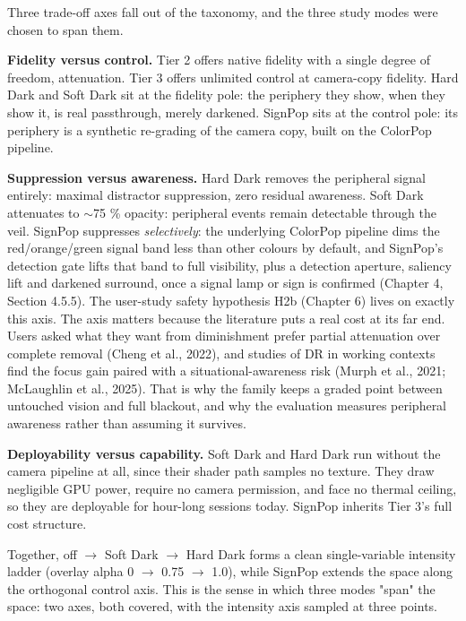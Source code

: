 Three trade-off axes fall out of the taxonomy, and the three study modes were chosen to span them.

\textbf{Fidelity versus control.} Tier 2 offers native fidelity with a single degree of freedom,
attenuation. Tier 3 offers unlimited control at camera-copy fidelity. Hard Dark and Soft Dark sit
at the fidelity pole: the periphery they show, when they show it, is real passthrough, merely
darkened. SignPop sits at the control pole: its periphery is a synthetic re-grading of the camera
copy, built on the ColorPop pipeline.

\textbf{Suppression versus awareness.} Hard Dark removes the peripheral signal entirely: maximal
distractor suppression, zero residual awareness. Soft Dark attenuates to $\sim$75 \% opacity: peripheral
events remain detectable through the veil. SignPop suppresses \textit{selectively}: the underlying ColorPop
pipeline dims the red/orange/green signal band less than other colours by default, and SignPop's
detection gate lifts that band to full visibility, plus a detection aperture, saliency lift and
darkened surround, once a signal lamp or sign is confirmed (Chapter 4, Section 4.5.5). The user-study
safety hypothesis H2b (Chapter 6) lives on exactly this axis. The axis matters because the literature
puts a real cost at its far end. Users asked what they want from diminishment prefer partial
attenuation over complete removal (Cheng et al., 2022), and studies of DR in working contexts find
the focus gain paired with a situational-awareness risk (Murph et al., 2021; McLaughlin et al.,
2025). That is why the family keeps a graded point between untouched vision and full blackout, and
why the evaluation measures peripheral awareness rather than assuming it survives.

\textbf{Deployability versus capability.} Soft Dark and Hard Dark run without the camera pipeline at all,
since their shader path samples no texture. They draw negligible GPU power, require no camera
permission, and face no thermal ceiling, so they are deployable for hour-long sessions today. SignPop
inherits Tier 3's full cost structure.

Together, off $\rightarrow$ Soft Dark $\rightarrow$ Hard Dark forms a clean single-variable intensity ladder (overlay alpha
0 $\rightarrow$ 0.75 $\rightarrow$ 1.0), while SignPop extends the space along the orthogonal control axis. This is the
sense in which three modes "span" the space: two axes, both covered, with the intensity axis sampled
at three points.

